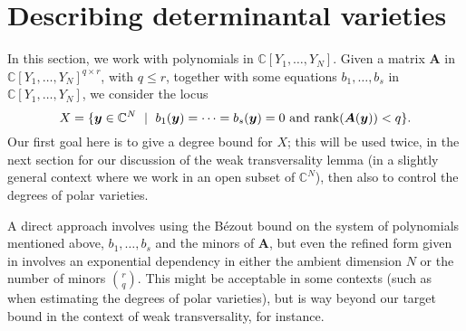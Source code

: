 \documentclass[12pt]{article}
\def\yb{{\bm y}}
\def\C{\mathbb{C}}
\begin{document}

\section{Describing determinantal varieties}\label{ssec:detvar}

In this section, we work with polynomials in $\C[Y_1,\dots,Y_N]$.
Given a matrix $\bm A$ in $\C[Y_1,\dots,Y_N]^{q \times r}$, with $q
\le r$, together with some equations $b_1,\dots,b_s$ in
$\C[Y_1,\dots,Y_N]$, we consider the locus
\[X = \{\yb \in \C^N \ \mid \ b_1(\yb) = \cdots = b_s(\yb) =0 
     \text{~and~} {\rm rank}(\bm A(\yb)) < q\}.\]
\noindent
Our first goal here is to give a degree bound for $X$; this will be
used twice, in the next section for our discussion of the weak
transversality lemma (in a slightly general context where we work in
an open subset of $\C^N$), then also to control the degrees of polar
varieties.

A direct approach involves using the B\'ezout bound on the system of
polynomials mentioned above, $b_1,\dots,b_s$ and the minors of $\bm
A$, but even the refined form given in \cite[Proposition
  2.3]{Heintz1980} involves an exponential dependency in either the
ambient dimension $N$ or the number of minors $r \choose q$. This
might be acceptable in some contexts (such as when estimating the
degrees of polar varieties), but is way beyond our target bound in the
context of weak transversality, for instance.
\end{document}
